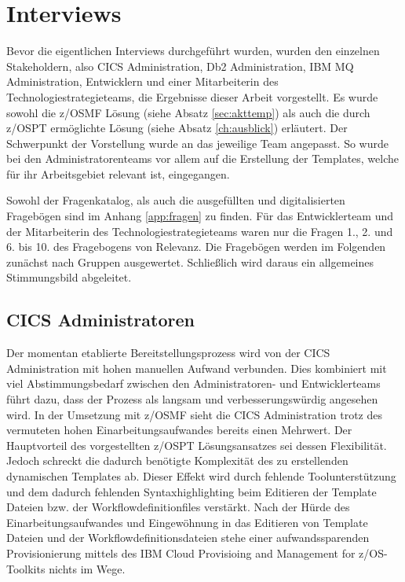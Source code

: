 \section{Interviews}
Bevor die eigentlichen Interviews durchgeführt wurden, wurden den einzelnen Stakeholdern, also CICS Administration, Db2 Administration, IBM MQ Administration, Entwicklern und einer Mitarbeiterin des Technologiestrategieteams, die Ergebnisse dieser Arbeit vorgestellt.
Es wurde sowohl die z/OSMF Lösung (siehe Absatz \ref{sec:akttemp}) als auch die durch z/OSPT ermöglichte Lösung (siehe Absatz \ref{ch:ausblick}) erläutert.
Der Schwerpunkt der Vorstellung wurde an das jeweilige Team angepasst.
So wurde bei den Administratorenteams vor allem auf die Erstellung der Templates, welche für ihr Arbeitsgebiet relevant ist, eingegangen.

Sowohl der Fragenkatalog, als auch die ausgefüllten und digitalisierten Fragebögen sind im Anhang \ref{app:fragen} zu finden.
Für das Entwicklerteam und der Mitarbeiterin des Technologiestrategieteams waren nur die Fragen 1., 2. und 6. bis 10. des Fragebogens von Relevanz.
Die Fragebögen werden im Folgenden zunächst nach Gruppen ausgewertet.
Schließlich wird daraus ein allgemeines Stimmungsbild abgeleitet.

\subsection{CICS Administratoren}
Der momentan etablierte Bereitstellungsprozess wird von der CICS Administration mit hohen manuellen Aufwand verbunden.
Dies kombiniert mit viel Abstimmungsbedarf zwischen den Administratoren- und Entwicklerteams führt dazu, dass der Prozess als langsam und verbesserungswürdig angesehen wird.
In der Umsetzung mit z/OSMF sieht die CICS Administration trotz des vermuteten hohen Einarbeitungsaufwandes bereits einen Mehrwert.
Der Hauptvorteil des vorgestellten z/OSPT Lösungsansatzes sei dessen Flexibilität.
Jedoch schreckt die dadurch benötigte Komplexität des zu erstellenden dynamischen Templates ab.
Dieser Effekt wird durch fehlende Toolunterstützung und dem dadurch fehlenden Syntaxhighlighting beim Editieren der Template Dateien bzw. der Workflowdefinitionfiles verstärkt.
Nach der Hürde des Einarbeitungsaufwandes und Eingewöhnung in das Editieren von Template Dateien und der Workflowdefinitionsdateien stehe einer aufwandssparenden Provisionierung mittels des \glqq IBM Cloud Provisioing and Management for z/OS\grqq-Toolkits nichts im Wege.

